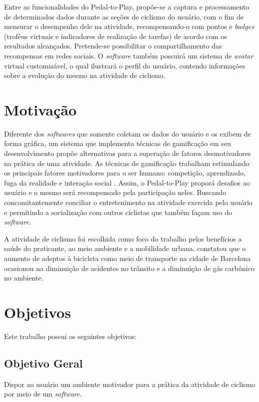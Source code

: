 Entre as funcionalidades do Pedal-to-Play, propõe-se a captura e processamento de determinados dados durante as seções de ciclismo do usuário, com o fim de mensurar o desempenho dele na atividade, recompensando-o com pontos e \textit{badges} (troféus virtuais e indicadores de realização de tarefas) de acordo com os resultados alcançados. Pretende-se possibilitar o compartilhamento das recompensas em redes sociais. O \textit{software} também possuirá um sistema de \textit{avatar} virtual customizável, o qual ilustrará o perfil do usuário, contendo informações sobre a evolução do mesmo na atividade de ciclismo.

\section{Motivação}
Diferente dos \textit{softwares} que somente coletam os dados do usuário e os exibem de forma gráfica, um sistema que implementa técnicas de gamificação em seu desenvolvimento propõe alternativas para a superação de fatores desmotivadores na prática de uma atividade. As técnicas de gamificação  trabalham estimulando os principais fatores motivadores para o ser humano: competição, aprendizado, fuga da realidade e interação social \cite{vianna2013}. Assim, o Pedal-to-Play proporá desafios ao usuário e o mesmo será recompensado pela participação neles. Buscando concomitantemente conciliar o entretenimento na atividade exercida pelo usuário e permitindo a socialização com outros ciclistas que também façam uso do \textit{software}. \par

A atividade de ciclismo foi escolhida como foco do trabalho pelos benefícios a saúde do praticante, ao meio ambiente e a mobilidade urbana. \citet{rojasrueda2011} constatou que o aumento de adeptos à bicicleta como meio de transporte na cidade de Barcelona ocasionou na diminuição de acidentes no trânsito e a diminuição de gás carbônico no ambiente.

\section{Objetivos}
Este trabalho possui os seguintes objetivos:

\subsection{Objetivo Geral}

Dispor ao usuário um ambiente motivador para a prática da atividade de ciclismo por meio de um \textit{software}.

